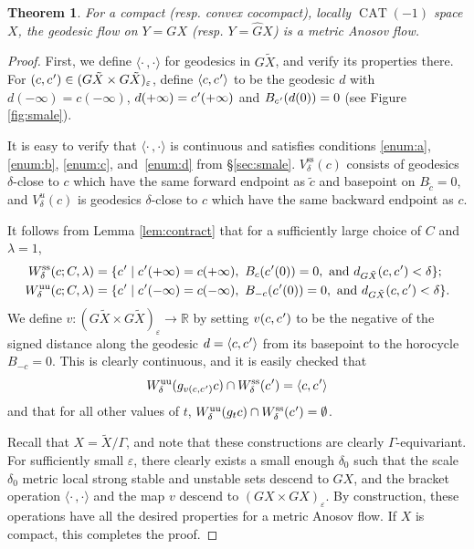 \documentclass[11pt]{article}
\let\epsilon\varepsilon
\let\sep\mid
\newcommand{\lrangle}{\langle\cdot\,,\cdot\rangle}
\newcommand{\cpr}{c\mkern1mu'}
\newcommand{\sts}{\mathrm{ss}}
\newcommand{\uu}{\mathrm{uu}}
\newtheorem{thm}{Theorem}[section]
\theoremstyle{definition}
\numberwithin{equation}{section}
\DeclareMathOperator{\CAT}{CAT}
\begin{document}
\begin{thm} \label{t.smale}
For a compact (resp. convex cocompact), locally $\CAT(-1)$ space $X$, the geodesic flow on $Y= GX$ (resp. $Y=\hat GX$) is a metric Anosov flow.
\end{thm}

\begin{proof}
First, we define $\lrangle$ for geodesics in $G\tilde X$, and verify its properties there. For $(c,\cpr)\in (G\tilde X \times G\tilde X)_\epsilon$, define $\langle c,\cpr\rangle $ to be the geodesic $d$ with $d(-\infty) = c(-\infty)$, $d(+\infty) = \cpr(+\infty)$ and $B_{\cpr}(d(0)) = 0$ (see Figure \ref{fig:smale}).

It is easy to verify that $\lrangle$ is continuous and satisfies conditions \eqref{enum:a}, \eqref{enum:b}, \eqref{enum:c}, and~\eqref{enum:d} from \S \ref{sec:smale}. $V_\delta^{\sts}(c)$ consists of geodesics $\delta$-close to $c$ which have the same forward endpoint as $\tilde c$ and basepoint on $B_{\tilde c} = 0$, and $V_\delta^u(c)$ is geodesics $\delta$-close to $c$ which have the same backward endpoint as $c$.

It follows from Lemma \ref{lem:contract} that for a sufficiently large choice of $C$ and $\lambda = 1$,
\begin{align*}
W^{\sts}_\delta(c;C,\lambda) &= \{\cpr\sep \cpr(+\infty) = c(+\infty), \ B_{c}(\cpr(0))=0, \mbox{ and } d_{G\tilde X}(c,\cpr)<\delta \}; \\
W^{\uu}_\delta(c;C,\lambda) &= \{\cpr\sep \cpr(-\infty) = c(-\infty), \ B_{-c}(\cpr(0))=0, \mbox{ and } d_{G\tilde X}(c,\cpr)<\delta \}. 
\end{align*}
We define $v:(G\tilde X\times G\tilde X)_\epsilon \to \mathbb{R}$ by setting $v(c,\cpr)$ to be the negative of the signed distance along the geodesic $d = \langle c,\cpr\rangle $ from its basepoint to the horocycle $B_{-c}=0$. This is clearly continuous, and it is easily checked that
\[ W^{\uu}_\delta(g_{v(c,\cpr)}c) \cap W^{\sts}_\delta(\cpr) = \langle c,\cpr\rangle \]
and that for all other values of $t$, $W^{\uu}_\delta(g_tc) \cap W^{\sts}_\delta(\cpr) = \emptyset$.

Recall that $X = \tilde X /\Gamma$, and note that these constructions are clearly $\Gamma$-equivariant. For sufficiently small $\epsilon$, there clearly exists a small enough $\delta_0$ such that the scale $\delta_0$ metric local strong stable and unstable sets descend to $GX$, and the bracket operation $\lrangle$ and the map $v$ descend to $(GX \times GX)_\epsilon$. By construction, these operations have all the desired properties for a metric Anosov flow. If $X$ is compact, this completes the proof.


\end{proof}
\end{document}
